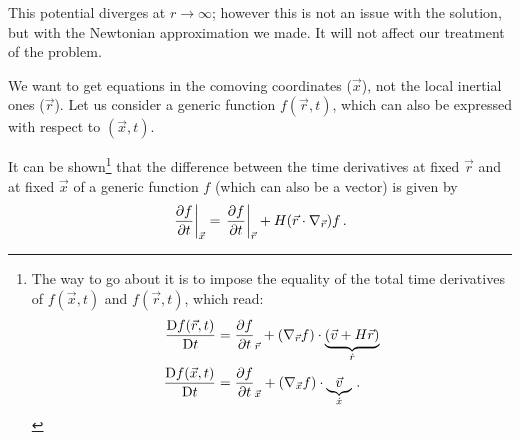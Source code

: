 \documentclass[main.tex]{subfiles}
\begin{document}
This potential diverges at \(r \rightarrow \infty\); however this is not an issue with the solution, but with the Newtonian approximation we made. 
It will not affect our treatment of the problem. 


We want to get equations in the comoving coordinates (\(\vec{x}\)), not the local inertial ones (\(\vec{r}\)).
Let us consider a generic function \(f(\vec{r}, t)\), which can also be expressed with respect to \((\vec{x}, t)\). 

It can be shown\footnote{The way to go about it is to impose the equality of the total time derivatives of \(f(\vec{x}, t)\) and \(f(\vec{r}, t)\), which read: 
%
\begin{align}
\frac{\mathrm{D} f(\vec{r}, t)}{\mathrm{D}t } 
&= \pdv{f}{t}_{\vec{r}} + \qty(\nabla_{\vec{r}} f) \cdot \underbrace{\qty(\vec{v} + H \vec{r})}_{\dot{r}} \\
\frac{\mathrm{D} f(\vec{x}, t)}{\mathrm{D}t } 
&= \pdv{f}{t}_{\vec{x}} + \qty(\nabla_{\vec{x}} f) \cdot \underbrace{\vec{v}}_{\dot{x}} 
\,.
\end{align}
} that the difference between the time derivatives at fixed \(\vec{r}\) and at fixed \(\vec{x}\) of a generic function \(f\) (which can also be a vector) is given by
%
\begin{align} \label{eq:comoving-derivatives-relation}
  \eval{\pdv{f}{t}}_{\vec{x}} =   \eval{\pdv{f}{t}}_{\vec{r}} + H \qty(\vec{r} \cdot \nabla_{\vec{r}}) f
\,.
\end{align}

  
\end{document}
